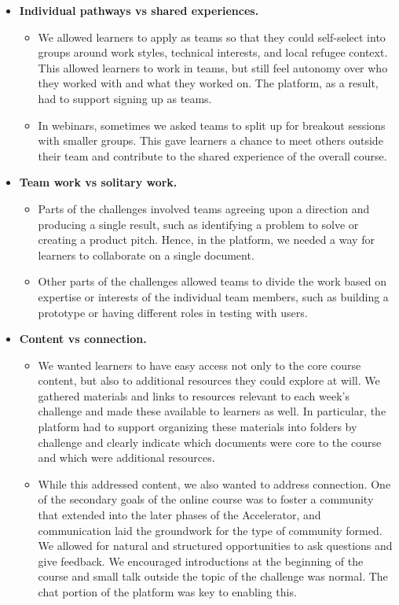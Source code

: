 \documentclass[12pt,twoside]{mitthesis}
\begin{document}
\begin{itemize}
\item \textbf{Individual pathways vs shared experiences.}
\begin{itemize}
	\item We allowed learners to apply as teams so that they could self-select into groups around work styles, technical interests, and local refugee context. This allowed learners to work in teams, but still feel autonomy over who they worked with and what they worked on. The platform, as a result, had to support signing up as teams.
	\item In webinars, sometimes we asked teams to split up for breakout sessions with smaller groups. This gave learners a chance to meet others outside their team and contribute to the shared experience of the overall course.
\end{itemize}
\item \textbf{Team work vs solitary work.}
\begin{itemize}
	\item Parts of the challenges involved teams agreeing upon a direction and producing a single result, such as identifying a problem to solve or creating a product pitch. Hence, in the platform, we needed a way for learners to collaborate on a single document.
	\item Other parts of the challenges allowed teams to divide the work based on expertise or interests of the individual team members, such as building a prototype or having different roles in testing with users.
\end{itemize}
\item \textbf{Content vs connection.} 
\begin{itemize}
	\item We wanted learners to have easy access not only to the core course content, but also to additional resources they could explore at will. We gathered materials and links to resources relevant to each week's challenge and made these available to learners as well. In particular, the platform had to support organizing these materials into folders by challenge and clearly indicate which documents were core to the course and which were additional resources.
	\item While this addressed content, we also wanted to address connection. One of the secondary goals of the online course was to foster a community that extended into the later phases of the Accelerator, and communication laid the groundwork for the type of community formed. We allowed for natural and structured opportunities to ask questions and give feedback. We encouraged introductions at the beginning of the course and small talk outside the topic of the challenge was normal. The chat portion of the platform was key to enabling this.
\end{itemize}
\end{itemize}
\end{document}
